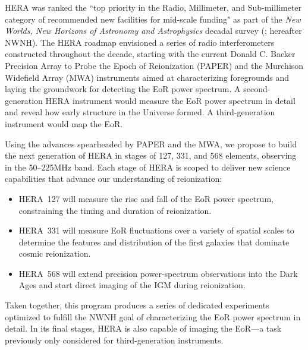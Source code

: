 \documentclass[preprint]{aastex}
\begin{document}
HERA was ranked the ``top priority in the Radio, Millimeter, and Sub-millimeter
category of recommended new facilities for mid-scale funding" as part of the
{\it New Worlds, New Horizons of Astronomy and Astrophysics} decadal survey
(\citealt{astro2010}; hereafter NWNH).  
The HERA roadmap envisioned a series of
radio interferometers constructed throughout the decade, starting with the 
current
Donald C. Backer Precision Array to Probe the Epoch of Reionization (PAPER) and 
the Murchison Widefield Array (MWA) instruments 
aimed at characterizing
foregrounds and laying the groundwork for detecting the EoR power
spectrum. 
A second-generation HERA instrument would measure the EoR power spectrum in
detail and reveal how early structure in the Universe formed. A
third-generation instrument would map the EoR.

Using the advances spearheaded by
PAPER and the MWA,
we propose to build the next generation of HERA in stages of 127, 331, and 568 elements,
observing in the 
50--225MHz band.
Each stage of HERA is scoped to deliver new science capabilities that advance our
understanding of reionization:
\vspace{-4pt}
\begin{itemize}\setlength{\parskip}{0pt}\itemsep0pt
\item HERA~127 will measure the rise and fall of the EoR power
spectrum, constraining the timing and duration of reionization.
\item HERA~331 will measure EoR fluctuations over a variety of
spatial scales to determine the features and distribution of
the first galaxies that dominate cosmic reionization.
\item HERA~568 will extend precision power-spectrum observations
into the Dark Ages and 
start direct imaging of the IGM during reionization.
\end{itemize}
\vspace{-4pt}
{ \setlength{\parindent}{0cm}
Taken together, this program produces a series of dedicated experiments
optimized to fulfill the NWNH goal of characterizing the EoR power spectrum
in detail. In its final stages, HERA
is also
capable of imaging the EoR---a task previously only considered for
third-generation instruments.}
\end{document}
